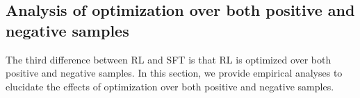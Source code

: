 \documentclass{article} %
\begin{document}
\subsection{Analysis of optimization over both positive and negative samples}

The third difference between RL and SFT is that RL is optimized over both positive and negative samples. In this section, we provide empirical analyses to elucidate the effects of optimization over both positive and negative samples.



 

\end{document}
